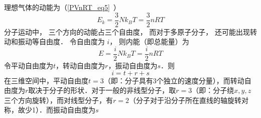 
\begin{issues}
\issueDraft
\end{issues}


理想气体的动能为（\autoref{PVnRT_eq5}~）
\begin{equation}
E_k = \frac32 Nk_B T = \frac{3}{2}nRT
\end{equation}
分子运动中， 三个方向的动能占三个自由度， 而对于多原子分子， 还可能出现转动和振动等自由度． 令自由度为 $i$， 则内能（即总能量）为
\begin{equation}\label{IdgEng_eq1}
E = \frac{i}{2}Nk_B T = \frac{i}{2}nRT
\end{equation}
令平动自由度为$t$，转动自由度为$r$，振动自由度为$s$．则
\begin{equation}
i=t+r+s
\end{equation}
在三维空间中，平动自由度$t=3$（即：分子具有3个独立的速度分量），而转动自由度为$r$取决于分子的形状．对于一般的非线型分子，取$r=3$（即：分子绕$x,y,z$三个方向旋转），而对线型分子，有$r=2$（分子对于沿分子所在直线的轴旋转对称，故少1）．而振动自由度为$s$